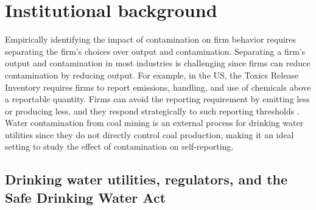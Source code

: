 \documentclass[12pt]{article}
\begin{document}

\section{Institutional background}\label{sec:background}

Empirically identifying the impact of contamination on firm behavior requires separating the firm's choices over output and contamination. Separating a firm's output and contamination in most industries is challenging since firms can reduce contamination by reducing output. For example, in the US, the Toxics Release Inventory requires firms to report emissions, handling, and use of chemicals above a reportable quantity. Firms can avoid the reporting requirement by emitting less or producing less, and they respond strategically to such reporting thresholds \parencite{bennear2005strategic}. Water contamination from coal mining is an external process for drinking water utilities since they do not directly control coal production, making it an ideal setting to study the effect of contamination on self-reporting.

\subsection{Drinking water utilities, regulators, and the Safe Drinking Water Act}
\end{document}
